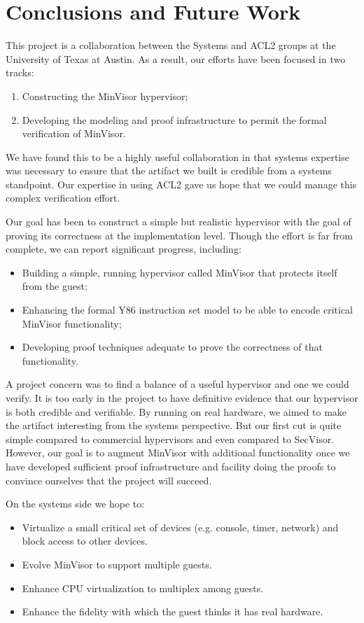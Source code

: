 \documentclass[submission,copyright]{eptcs} \providecommand{\event}{ACL2 2011}
\begin{document}
\section{Conclusions and Future Work}
\label{Conclusions and Future Work}

This project is a collaboration between the Systems and ACL2 groups at
the University of Texas at Austin.  As a result, our efforts have
been focused in two tracks:
\begin{enumerate}
\item Constructing the MinVisor hypervisor;
\item Developing the modeling and proof infrastructure to permit the
formal verification of MinVisor. 
\end{enumerate}
We have found this to be a highly useful collaboration in that
systems expertise was necessary to ensure that the artifact we built
is credible from a systems standpoint.  Our expertise in using ACL2
gave us hope that we could manage this complex verification
effort. 

Our goal has been to construct a simple but realistic hypervisor with
the goal of proving its correctness at the implementation level.
Though the effort is far from complete, we can report significant
progress, including:
\begin{itemize}
\item Building a simple, running hypervisor called MinVisor that
protects itself from the guest;
\item Enhancing the formal Y86 instruction set model to be able to
encode critical MinVisor functionality;
\item Developing proof techniques adequate to prove the correctness of
that functionality.
\end{itemize}

A project concern was to find a balance of a useful hypervisor and one
we could verify.  It is too early in the project to have definitive
evidence that our hypervisor is both credible and verifiable.  By
running on real hardware, we aimed to make the artifact interesting from
the systems perspective.  But our first cut is quite simple compared
to commercial hypervisors and even compared to SecVisor.  However, our
goal is to augment MinVisor with additional functionality once we have
developed sufficient proof infrastructure and facility doing the
proofs to convince ourselves that the project will succeed. 

On the systems side we hope to:
\begin{itemize}
\item Virtualize a small critical set of devices (e.g. console, timer, network)
     and block access to other devices.
\item Evolve MinVisor to support multiple guests.
\item Enhance CPU virtualization to multiplex among guests.
\item Enhance the fidelity with which the guest thinks it has real hardware.
\end{itemize}
\end{document}

